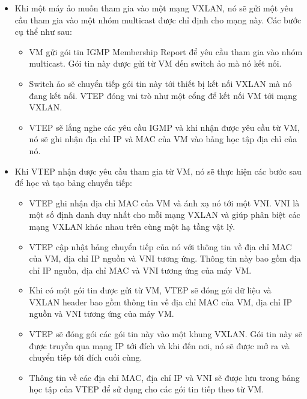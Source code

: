 \documentclass[13pt]{article}
\begin{document}
\begin{itemize}
    \item Khi một máy ảo muốn tham gia vào một mạng VXLAN, nó sẽ gửi một yêu cầu tham gia vào một nhóm multicast được chỉ định cho mạng này. Các bước cụ thể như sau:
    \begin{itemize}
        \item VM gửi gói tin IGMP Membership Report để yêu cầu tham gia vào nhóm multicast. Gói tin này được gửi từ VM đến switch ảo mà nó kết nối.
        \item Switch ảo sẽ chuyển tiếp gói tin này tới thiết bị kết nối VXLAN mà nó đang kết nối. VTEP đóng vai trò như một cổng để kết nối VM tới mạng VXLAN.
        \item VTEP sẽ lắng nghe các yêu cầu IGMP và khi nhận được yêu cầu từ VM, nó sẽ ghi nhận địa chỉ IP và MAC của VM vào bảng học tập địa chỉ của nó.
    \end{itemize}

    \item Khi VTEP nhận được yêu cầu tham gia từ VM, nó sẽ thực hiện các bước sau để học và tạo bảng chuyển tiếp:
    \begin{itemize}
        \item VTEP ghi nhận địa chỉ MAC của VM và ánh xạ nó tới một VNI. VNI là một số định danh duy nhất cho mỗi mạng VXLAN và giúp phân biệt các mạng VXLAN khác nhau trên cùng một hạ tầng vật lý.
        \item VTEP cập nhật bảng chuyển tiếp của nó với thông tin về địa chỉ MAC của VM, địa chỉ IP nguồn và VNI tương ứng. Thông tin này bao gồm địa chỉ IP nguồn, địa chỉ MAC và VNI tương ứng của máy VM.
        \item Khi có một gói tin được gửi từ VM, VTEP sẽ đóng gói dữ liệu và VXLAN header bao gồm thông tin về địa chỉ MAC của VM, địa chỉ IP nguồn và VNI tương ứng của máy VM.
        \item VTEP sẽ đóng gói các gói tin này vào một khung VXLAN. Gói tin này sẽ được truyền qua mạng IP tới đích và khi đến nơi, nó sẽ được mở ra và chuyển tiếp tới đích cuối cùng.
        \item Thông tin về các địa chỉ MAC, địa chỉ IP và VNI sẽ được lưu trong bảng học tập của VTEP để sử dụng cho các gói tin tiếp theo từ VM.
    \end{itemize}
\end{itemize}
\end{document}
